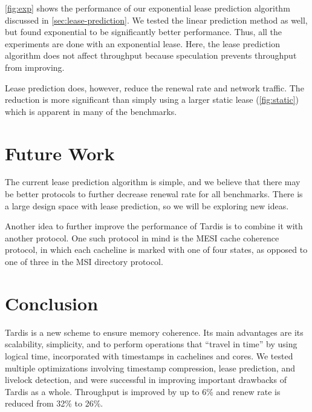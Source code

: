 \documentclass[12pt]{article}
\begin{document}
\cref{fig:exp} shows the performance of our exponential lease 
prediction algorithm discussed in \cref{sec:lease-prediction}. We tested the linear prediction method as well, but found exponential to be significantly better performance. Thus, all the experiments are done with an exponential lease.
Here, the lease prediction algorithm does not affect throughput 
because speculation prevents throughput from improving.

Lease prediction does, however, reduce the renewal rate and network 
traffic. The reduction is more significant than simply using a larger 
static lease (\cref{fig:static}) which is apparent in many of the 
benchmarks.

\section{Future Work}

The current lease prediction algorithm is simple, and we believe that 
there may be better protocols to further decrease renewal rate for all 
benchmarks. There is a large design space with lease prediction, so we 
will be exploring new ideas.

Another idea to further improve the performance of Tardis is to 
combine it with another protocol. One such protocol in mind is the 
MESI cache coherence protocol, in which each cacheline is marked with 
one of four states, as opposed to one of three in the MSI directory 
protocol.

\section{Conclusion}

Tardis is a new scheme to ensure memory coherence. Its main advantages 
are its scalability, simplicity, and to perform operations that 
``travel in time'' by using logical time, incorporated with timestamps 
in cachelines and cores. We tested multiple optimizations involving 
timestamp compression, lease prediction, and livelock detection, and 
were successful in improving important drawbacks of Tardis as a whole. Throughput is improved by up to 6\% and renew rate is reduced from 32\% to 26\%.

{
	
	
}
\end{document}

